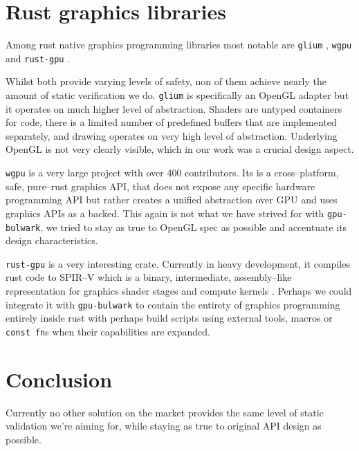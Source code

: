 \section{Rust graphics libraries}

Among rust native graphics programming libraries most notable are \texttt{glium} \cite{gliumgithub}, \texttt{wgpu} \cite{wgpugithub} and \texttt{rust-gpu} \cite{rustgpugithub}.

Whilst both provide varying levels of safety, non of them achieve nearly the amount of static verification we do.
\texttt{glium} is specifically an OpenGL adapter but it operates on much higher level of abstraction.
Shaders are untyped containers for code, there is a limited number of predefined buffers that are implemented separately, 
and drawing operates on very high level of abstraction. 
Underlying OpenGL is not very clearly visible, which in our work was a crucial design aspect.

\texttt{wgpu} is a very large project with over 400 contributors. Its is a cross--platform, safe, pure--rust graphics API, that
does not expose any specific hardware programming API but rather creates a unified abstraction over GPU and uses graphics APIs 
as a backed.
This again is not what we have strived for with \texttt{gpu-bulwark}, we tried to stay as true to OpenGL spec as possible
and accentuate its design characteristics.

\texttt{rust-gpu} is a very interesting crate. Currently in heavy development, it compiles rust code to SPIR--V which is a binary, intermediate, 
assembly--like representation for graphics shader stages and compute kernels \cite{spirvspec}.
Perhaps we could integrate it with \texttt{gpu-bulwark} to contain the entirety of graphics programming entirely inside rust 
with perhaps build scripts using external tools, macros or \texttt{const fn}s when their capabilities are expanded.

\section{Conclusion}

Currently no other solution on the market provides the same level of static validation we're aiming for, while staying as true to original API design as possible.

